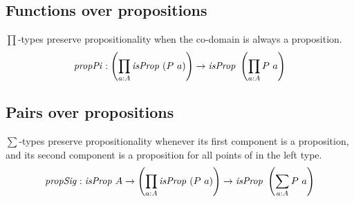 \subsection{Functions over propositions}
\label{sec:propPi}
$\prod$-types preserve propositionality when the co-domain is always a
proposition.
%
$$
\mathit{propPi} \tp \left(\prod_{a \tp A} \isProp\ (P\ a)\right) \to \isProp\ \left(\prod_{a \tp A} P\ a\right)
$$
\subsection{Pairs over propositions}
\label{sec:propSig}
%
$\sum$-types preserve propositionality whenever its first component is a
proposition, and its second component is a proposition for all points of in the
left type.
%
$$
\mathit{propSig} \tp \isProp\ A \to \left(\prod_{a \tp A} \isProp\ (P\ a)\right) \to \isProp\ \left(\sum_{a \tp A} P\ a\right)
$$
